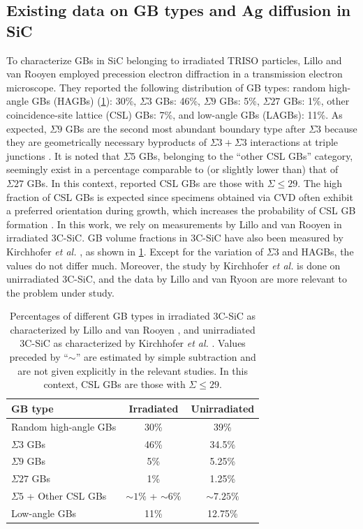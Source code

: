 \documentclass[%
preprint,
amsmath,amssymb,
aps,
]{revtex4-2}
\newcommand{\?}{\stackrel{?}{=}}
\begin{document}

\subsection{Existing data on GB types and Ag diffusion in SiC}\label{sec:exp_data}

To characterize GBs in SiC belonging to irradiated TRISO particles, Lillo and van Rooyen \cite{Lillo2016} employed precession electron diffraction in a transmission electron microscope. They reported the following distribution of GB types: random high-angle GBs (HAGBs) (\cref{Tab:GB}): 30\%, $\Sigma 3$ GBs: 46\%, $\Sigma 9$ GBs: 5\%, $\Sigma 27$ GBs: 1\%, other coincidence-site lattice (CSL) GBs: 7\%, and low-angle GBs (LAGBs): 11\%. As expected, $\Sigma 9$ GBs are the second most abundant boundary type after $\Sigma 3$ because they are geometrically necessary byproducts of $\Sigma 3 + \Sigma 3$ interactions at triple junctions \cite{Randle2011}. It is noted that $\Sigma 5$ GBs, belonging to the ``other CSL GBs'' category, seemingly exist in a percentage comparable to (or slightly lower than) that of $\Sigma 27$ GBs. In this context, reported CSL GBs are those with $\Sigma \leq 29$. The high fraction of CSL GBs is expected since specimens obtained via CVD often exhibit a preferred orientation during growth, which increases the probability of CSL GB formation \cite{Tanaka2002}. In this work, we rely on measurements by Lillo and van Rooyen \cite{Lillo2016} in irradiated 3C-SiC. GB volume fractions in 3C-SiC have also been measured by Kirchhofer \textit{et al.} \cite{Kirchhofer2013}, as shown in \cref{Tab:GB}. Except for the variation of $\Sigma 3$ and HAGBs, the values do not differ much. Moreover, the study by Kirchhofer \textit{et al.} is done on unirradiated 3C-SiC, and the data by Lillo and van Ryoon are more relevant to the problem under study.

\begin{table}[h!]
\centering
\footnotesize
\caption{Percentages of different GB types in irradiated 3C-SiC as characterized by Lillo and van Rooyen \cite{Lillo2016}, and unirradiated 3C-SiC as characterized by Kirchhofer \textit{et al.} \cite{Kirchhofer2013}. Values preceded by ``$\sim$'' are estimated by simple subtraction and are not given explicitly in the relevant studies. In this context, CSL GBs are those with $\Sigma \leq 29$.}
\begin{tabular}{lcc}
\hline
GB type & Irradiated \cite{Lillo2016} & Unirradiated \cite{Kirchhofer2013} \\
\hline
Random high-angle GBs & 30\% & 39\% \\
$\Sigma 3$ GBs & 46\% & 34.5\% \\
$\Sigma 9$ GBs & 5\% & 5.25\% \\
$\Sigma 27$ GBs & 1\% & 1.25\% \\
$\Sigma 5$ + Other CSL GBs & $\sim 1\%$ + $\sim 6\%$ & $\sim 7.25\%$ \\
Low-angle GBs & 11\% & 12.75\% \\
\hline
\end{tabular}
\label{Tab:GB}
\end{table}
\end{document}
